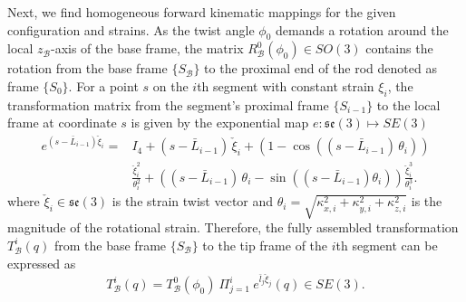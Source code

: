 Next, we find homogeneous forward kinematic mappings for the given configuration and strains.
As the twist angle $\phi_0$ demands a rotation around the local $z_{\mathcal{B}}$-axis of the base frame, the matrix $R_{\mathcal{B}}^0(\phi_0) \in SO(3)$ contains the rotation from the base frame $\{ S_{\mathcal{B}} \}$ to the proximal end of the rod denoted as frame $\{ S_{0} \}$.
For a point $s$ on the $i$th segment with constant strain $\xi_i$, the transformation matrix from the segment's proximal frame $\{ S_{i-1} \}$ to the local frame at coordinate $s$ is given by the exponential map $e: \mathfrak{se}(3) \mapsto SE(3)$~\citep{renda2018discrete}
\begin{equation}
\begin{split}
    e^{(s-\bar{L}_{i-1}) \check{\xi}_i} =& I_4 + (s-\bar{L}_{i-1}) \, \check{\xi}_i + \left ( 1 - \cos((s-\bar{L}_{i-1}) \, \theta_i) \right )\\ 
    &\frac{\check{\xi}_i^2}{\theta_i^2} + \left ( (s-\bar{L}_{i-1}) \, \theta_i - \sin((s-\bar{L}_{i-1}) \theta_i) \right ) \frac{\check{\xi}_i^3}{\theta_i^3}.
\end{split}
\end{equation}
where $\check{\xi}_i \in \mathfrak{se}(3)$ is the strain twist vector and $\theta_i = \sqrt{\kappa_{x,i}^2 + \kappa_{y,i}^2 + \kappa_{z,i}^2}$ is the magnitude of the rotational strain.
Therefore, the fully assembled transformation $T_{\mathcal{B}}^i(q)$ from the base frame $\{ S_{\mathcal{B}} \}$ to the tip frame of the $i$th segment can be expressed as
\begin{equation}
    T_{\mathcal{B}}^i(q) = T_{\mathcal{B}}^0(\phi_0) \: \Pi_{j=1}^{i} \: e^{\bar{l}_{j} \check{\xi}_{j}}(q) \in SE(3).
\end{equation}


